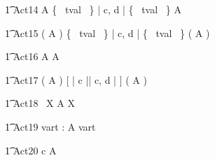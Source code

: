 
\begin{circusaction}
        \t1 Act14 \circdef  A \circendby {} \rcirctime   \lpar \{~ tval ~\} | \lchanset c, d \rchanset | \{~ tval ~\} \rpar A \circendby {} \rcirctime \\
\end{circusaction}

\begin{circusaction}
        \t1 Act15 \circdef ( A \circendby {} \rcirctime )  \lpar \{~ tval ~\} | \lchanset c, d \rchanset | \{~ tval ~\} \rpar ( A \circendby {} \rcirctime )\\
\end{circusaction}


\begin{circusaction}
        \t1 Act16 \circdef A \circendby {}  A \circendby {} \rcirctime\\
\end{circusaction}

\begin{circusaction}
        \t1 Act17 \circdef ( A \circendby {} \rcirctime)  [ | \lchanset c \rchanset || \lchanset c, d \rchanset | ] ( A \circendby {} \rcirctime )\\
\end{circusaction}


\begin{circusaction}
	\t1 Act18 \circdef \circmu~X \circspot A \circendby {} \rcirctime  \circseq X \\
\end{circusaction}


\begin{circusaction}
	\t1 Act19 \circdef \circvres vart : \nat  \circspot  A \circendby \lcirctime vart \rcirctime  \\
\end{circusaction}


\begin{circusaction}
	\t1 Act20 \circdef c \then  A \circendby {} \rcirctime \\
\end{circusaction}

